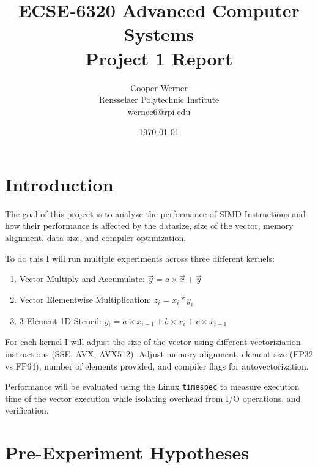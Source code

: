 \documentclass[11pt]{article}
\title{\textbf{ECSE-6320 Advanced Computer Systems \\ Project 1 Report}}
\author{Cooper Werner \\\small Rensselaer Polytechnic Institute \\ \small wernec6@rpi.edu}
\date{\today}
\begin{document}
\maketitle

\tableofcontents
\newpage

\section{Introduction}


The goal of this project is to analyze the performance of SIMD Instructions and how their performance is affected by
the datasize, size of the vector, memory alignment, data size, and compiler optimization.

To do this I will run multiple experiments across three different kernels:

\begin{enumerate}
	\item Vector Multiply and Accumulate: $\vec{y} = a \times \vec{x} + \vec{y} $
	\item Vector Elementwise Multiplication: $z_i = x_i * y_i$
	\item 3-Element 1D Stencil: $y_i = a\times x_{i-1} + b \times x_{i} + c \times x_{i+1}$
\end{enumerate}

For each kernel I will adjust the size of the vector using different vectoriziation instructions (SSE, AVX, AVX512).
Adjust memory alignment, element size (FP32 vs FP64), number of elements provided, and compiler flags for
autovectorization.

Performance will be evaluated using the Linux \texttt{timespec} to measure execution time of the vector execution while
isolating overhead from I/O operations, and verification.

\section{Pre-Experiment Hypotheses}
\end{document}
